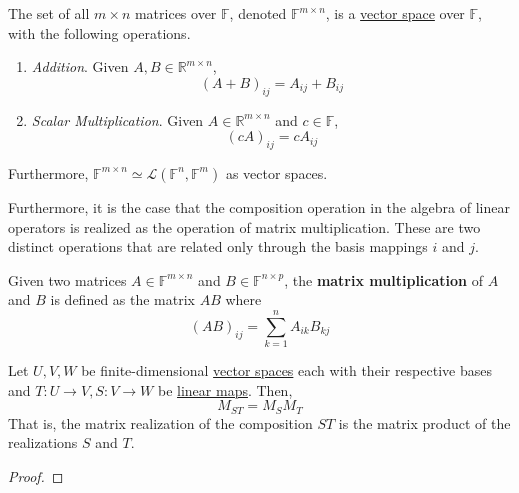 	\begin{theorem}
	  \label{thm:vector-space-of-matrices}
		The set of all $m \times n$ matrices over $\mathbb{F}$, denoted $\mathbb{F}^{m \times n}$, is a \hyperref[def:vector-space]{vector space} over $\mathbb{F}$, with the following operations. 
		\begin{enumerate}
			\item \textit{Addition}. Given $A, B \in \mathbb{R}^{m \times n}$, 
				\begin{equation}
					(A + B)_{ij} = A_{ij} + B_{ij}
				\end{equation}
			\item \textit{Scalar Multiplication}. Given $A \in \mathbb{R}^{m \times n}$ and $c \in \mathbb{F}$, 
				\begin{equation}
					(cA)_{ij} = c A_{ij}
				\end{equation}
		\end{enumerate}
		Furthermore, $\mathbb{F}^{m \times n} \simeq \mathcal{L}(\mathbb{F}^n, \mathbb{F}^m)$ as vector spaces. 
	\end{theorem}

	Furthermore, it is the case that the composition operation in the algebra of linear operators is realized as the operation of matrix multiplication. These are two distinct operations that are related only through the basis mappings $i$ and $j$. 

	\begin{definition}
	  \label{def:matrix-multiplication}
		Given two matrices $A \in \mathbb{F}^{m \times n}$ and $B \in \mathbb{F}^{n \times p}$, the \textbf{matrix multiplication} of $A$ and $B$ is defined as the matrix $AB$ where 
		\begin{equation}
			(AB)_{ij} = \sum_{k=1}^n A_{ik} B_{kj}
		\end{equation}
	\end{definition}

	\begin{lemma}
	  \label{thm:matrix-multiplication-as-realization-of}
	  Let $U, V, W$ be finite-dimensional \hyperref[def:vector-space]{vector spaces} each with their respective bases and $T: U \to V, S: V \to W$ be \hyperref[def:linear_map]{linear maps}. Then, 
		\begin{equation}
			M_{ST} = M_S M_T
		\end{equation}
		That is, the matrix realization of the composition $ST$ is the matrix product of the realizations $S$ and $T$. 
	\end{lemma}
	\begin{proof}
	  
	\end{proof}

